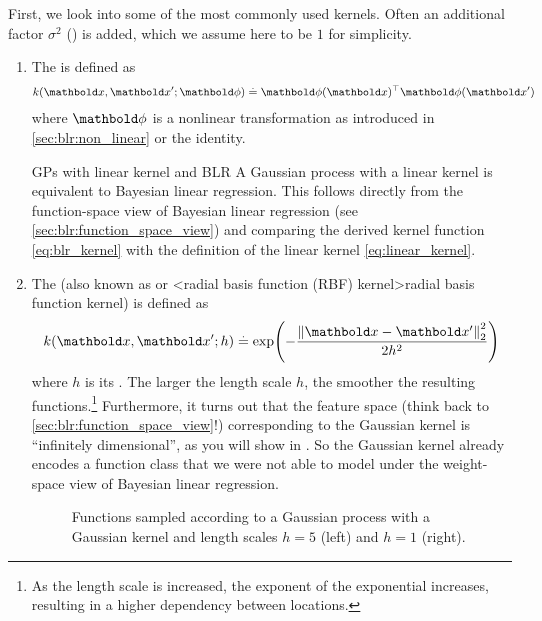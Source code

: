 First, we look into some of the most commonly used kernels. Often an additional factor $\sigma^2$ () is added, which we assume here to be $1$ for simplicity.

\begin{enumerate}
  \item The  is defined as \begin{align}
    k(\vx, \vxp; \vphi) \defeq \transpose{\vphi(\vx)} \vphi(\vxp) \label{eq:linear_kernel}
  \end{align} where $\vphi$ is a nonlinear transformation as introduced in \cref{sec:blr:non_linear} or the identity.

  \begin{rmk}{GPs with linear kernel and BLR}{}
    A Gaussian process with a linear kernel is equivalent to Bayesian linear regression.
    This follows directly from the function-space view of Bayesian linear regression (see \cref{sec:blr:function_space_view}) and comparing the derived kernel function \eqref{eq:blr_kernel} with the definition of the linear kernel \eqref{eq:linear_kernel}.
  \end{rmk}

  \item The  (also known as  or \midx<radial basis function (RBF) kernel>{radial basis function kernel}) is defined as \begin{align}
    k(\vx, \vxp; h) \defeq \exp\parentheses*{-\frac{\norm{\vx-\vxp}_2^2}{2 h^2}} \label{eq:gaussian_kernel}
  \end{align} where $h$ is its . The larger the length scale $h$, the smoother the resulting functions.\footnote[][-1\baselineskip]{As the length scale is increased, the exponent of the exponential increases, resulting in a higher dependency between locations.}
  Furthermore, it turns out that the feature space (think back to \cref{sec:blr:function_space_view}!) corresponding to the Gaussian kernel is ``infinitely dimensional'', as you will show in .
  So the Gaussian kernel already encodes a function class that we were not able to model under the weight-space view of Bayesian linear regression.

  \begin{figure}
    \caption{Functions sampled according to a Gaussian process with a Gaussian kernel and length scales $h = 5$ (left) and $h = 1$ (right).}
  \end{figure}


\end{enumerate}

